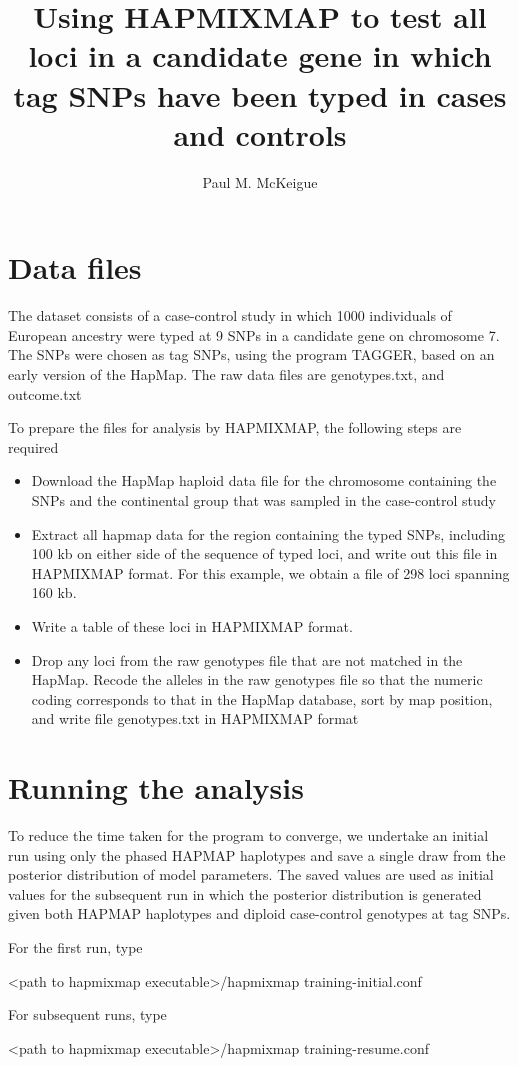 \documentclass[preprint, a4paper]{aastex}
\title{Using HAPMIXMAP to test all loci in a
   candidate gene in which tag SNPs have been typed in cases and
   controls} \author{Paul M.  McKeigue}
\begin{document}
\section{Data files}
The dataset consists of a case-control study in which 1000 individuals
of  European ancestry  were typed  at 9  SNPs in  a candidate  gene on
chromosome 7.  The SNPs were chosen as tag
SNPs,  using the  program TAGGER,  based on  an early  version  of the
HapMap.  The raw data files are genotypes.txt, and outcome.txt 

To prepare  the files for  analysis by HAPMIXMAP, the  following steps
are required
\begin{itemize}
\item{}Download the HapMap haploid data file for the chromosome containing
  the  SNPs  and  the  continental  group  that  was  sampled  in  the
  case-control study
\item{} Extract  all hapmap data  for the region containing  the typed
  SNPs, including 100 kb on either side of the sequence of typed loci,
  and write out  this file in HAPMIXMAP format.   For this example, we
  obtain a file of 298 loci spanning 160 kb. 
\item{} Write a table of these loci in HAPMIXMAP format.  
\item{} Drop any loci from the raw genotypes file that are not matched
  in the HapMap.  Recode the alleles in the raw genotypes file so that the
numeric coding corresponds  to that in the HapMap  database, sort by
  map position, and write file genotypes.txt in HAPMIXMAP format
\end{itemize}

\section{Running the analysis}
To reduce the time taken for the program to converge, we undertake an
initial run using only the phased HAPMAP haplotypes and save a single
draw from the posterior distribution of model parameters.  The saved
values are used as initial values for the subsequent run in which the
posterior distribution is generated given both HAPMAP haplotypes and
diploid case-control genotypes at tag SNPs.

For the first run, type

<path to hapmixmap executable>/hapmixmap training-initial.conf

For subsequent runs, type

<path to hapmixmap executable>/hapmixmap training-resume.conf
\end{document}
